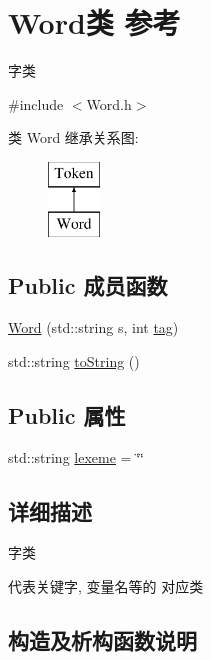 \hypertarget{class_word}{}\section{Word类 参考}
\label{class_word}


字类  




{\ttfamily \#include $<$Word.\+h$>$}

类 Word 继承关系图\+:\begin{figure}[H]
\begin{center}
\leavevmode
\includegraphics[height=2.000000cm]{class_word}
\end{center}
\end{figure}
\subsection*{Public 成员函数}
\begin{DoxyCompactItemize}
\item 
\hyperlink{class_word_acb127ce0ab789dc0ecfc407dec786ac2}{Word} (std\+::string s, int \hyperlink{class_token_a2a4b0e1b648c2a9be1976004eb3c4ff0}{tag})
\item 
std\+::string \hyperlink{class_word_a950a81bfd0fc369b0eb8d0d6b27e2870}{to\+String} ()
\end{DoxyCompactItemize}
\subsection*{Public 属性}
\begin{DoxyCompactItemize}
\item 
std\+::string \hyperlink{class_word_a34691d869ec57b2a0b7a8eb41230b92a}{lexeme} = \char`\"{}\char`\"{}
\end{DoxyCompactItemize}


\subsection{详细描述}
字类 

代表关键字, 变量名等的 对应类 

\subsection{构造及析构函数说明}
\mbox{\label{class_word_acb127ce0ab789dc0ecfc407dec786ac2}} 
